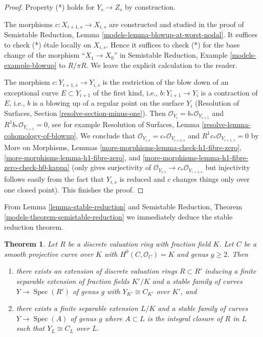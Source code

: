 \documentclass{stacks-project}
\newenvironment{reference}{\comment}{\endcomment}
\theoremstyle{plain}
\newtheorem{theorem}[subsection]{Theorem}
\theoremstyle{definition}
\theoremstyle{remark}
\numberwithin{equation}{subsection}
\def\Spec{\mathop{\mathrm{Spec}}}
\begin{document}
\begin{proof}
\medskip\noindent
Property (*) holds for $Y_s \to Z_s$ by construction.

\medskip\noindent
The morphisms $c : X_{i + 1, s} \to X_{i, s}$ are constructed and studied
in the proof of
Semistable Reduction, Lemma \ref{models-lemma-blowup-at-worst-nodal}.
It suffices to check (*) \'etale locally on $X_{i, s}$.
Hence it suffices to check (*) for the base change of the morphism
``$X_1 \to X_0$'' in Semistable Reduction, Example \ref{models-example-blowup}
to $R/\pi R$.
We leave the explicit calculation to the reader.

\medskip\noindent
The morphism $c : Y_{i + 1, s} \to Y_{i, s}$ is the restriction
of the blow down of an exceptional curve $E \subset Y_{i + 1}$
of the first kind, i.e., $b : Y_{i + 1} \to Y_i$ is a contraction of $E$,
i.e., $b$ is a blowing up of a regular point on the surface $Y_i$
(Resolution of Surfaces, Section \ref{resolve-section-minus-one}).
Then $\mathcal{O}_{Y_i} = b_*\mathcal{O}_{Y_{i + 1}}$ and
$R^1b_*\mathcal{O}_{Y_{i + 1}} = 0$, see for example
Resolution of Surfaces, Lemma
\ref{resolve-lemma-cohomology-of-blowup}.
We conclude that $\mathcal{O}_{Y_{i, s}} = c_*\mathcal{O}_{Y_{i + 1, s}}$
and $R^1c_*\mathcal{O}_{Y_{i + 1, s}} = 0$ by
More on Morphisms, Lemmas \ref{more-morphisms-lemma-check-h1-fibre-zero},
\ref{more-morphisms-lemma-h1-fibre-zero}, and
\ref{more-morphisms-lemma-h1-fibre-zero-check-h0-kappa}
(only gives surjectivity of
$\mathcal{O}_{Y_{i, s}} \to c_*\mathcal{O}_{Y_{i + 1, s}}$ but
injectivity follows easily from the fact that $Y_{i, s}$ is reduced
and $c$ changes things only over one closed point).
This finishes the proof.
\end{proof}

\noindent
From Lemma \ref{lemma-stable-reduction} and
Semistable Reduction, Theorem \ref{models-theorem-semistable-reduction}
we immediately deduce the stable reduction theorem.

\begin{theorem}
\label{theorem-stable-reduction}
\begin{reference}
\cite[Corollary 2.7]{DM}
\end{reference}
Let $R$ be a discrete valuation ring with fraction field $K$. Let $C$ be a
smooth projective curve over $K$ with $H^0(C, \mathcal{O}_C) = K$
and genus $g \geq 2$. Then
\begin{enumerate}
\item there exists an extension of discrete valuation rings $R \subset R'$
inducing a finite separable extension of fraction fields $K'/K$ and
a stable family of curves $Y \to \Spec(R')$ of genus $g$ with
$Y_{K'} \cong C_{K'}$ over $K'$, and
\item there exists a finite separable extension $L/K$ and a stable
family of curves $Y \to \Spec(A)$ of genus $g$ where $A \subset L$
is the integral closure of $R$ in $L$ such that
$Y_L \cong C_L$ over $L$.
\end{enumerate}
\end{theorem}
\end{document}
